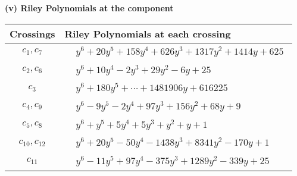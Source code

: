 \documentclass[1p]{elsarticle_modified}
\theoremstyle{definition}
\begin{document}
\flushleft \textbf{(v) Riley Polynomials at the component}\newline \\
\begin{tabular}{m{50pt}|m{274pt}}
Crossings & \hspace{64pt}Riley Polynomials at each crossing \\
\hline $$\begin{aligned}c_{1},c_{7}\end{aligned}$$&$\begin{aligned}
&y^6+20 y^5+158 y^4+626 y^3+1317 y^2+1414 y+625
\end{aligned}$\\
\hline $$\begin{aligned}c_{2},c_{6}\end{aligned}$$&$\begin{aligned}
&y^6+10 y^4-2 y^3+29 y^2-6 y+25
\end{aligned}$\\
\hline $$\begin{aligned}c_{3}\end{aligned}$$&$\begin{aligned}
&y^6+180 y^5+\cdots+1481906 y+616225
\end{aligned}$\\
\hline $$\begin{aligned}c_{4},c_{9}\end{aligned}$$&$\begin{aligned}
&y^6-9 y^5-2 y^4+97 y^3+156 y^2+68 y+9
\end{aligned}$\\
\hline $$\begin{aligned}c_{5},c_{8}\end{aligned}$$&$\begin{aligned}
&y^6+y^5+5 y^4+5 y^3+y^2+y+1
\end{aligned}$\\
\hline $$\begin{aligned}c_{10},c_{12}\end{aligned}$$&$\begin{aligned}
&y^6+20 y^5-50 y^4-1438 y^3+8341 y^2-170 y+1
\end{aligned}$\\
\hline $$\begin{aligned}c_{11}\end{aligned}$$&$\begin{aligned}
&y^6-11 y^5+97 y^4-375 y^3+1289 y^2-339 y+25
\end{aligned}$\\
\hline
\end{tabular}\\~\\
\end{document}
